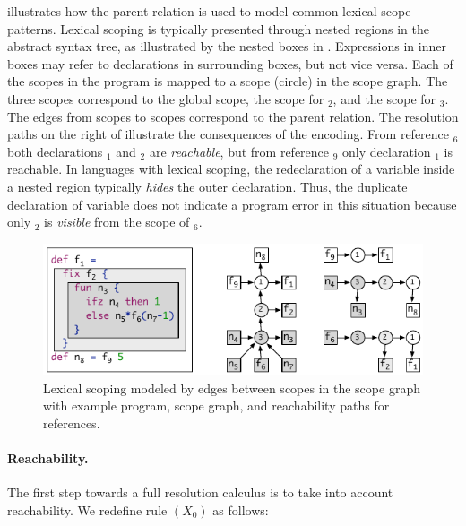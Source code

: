  illustrates how the parent relation is used to model common
lexical scope patterns.
Lexical scoping is typically presented through nested regions in the abstract
syntax tree, as illustrated by the nested boxes in .
Expressions in inner boxes may refer to declarations in surrounding boxes, but
not vice versa.
Each of the scopes in the program is mapped to a scope (circle) in the scope
graph.
The three scopes correspond to the global scope, the scope for $_2$, and the scope for $_3$.
The edges from scopes to scopes correspond to the parent relation.
The resolution paths on the right of  illustrate the consequences
of the encoding.
From reference $_6$ both declarations $_1$ and
$_2$ are \emph{reachable}, but from reference $_9$ only
declaration $_1$ is reachable.
In languages with lexical scoping, the redeclaration of
a variable inside a nested region typically \emph{hides} the outer
declaration.
Thus, the duplicate declaration of variable  does not indicate
a program error in this situation
because only $_2$ is \emph{visible} from the scope of
$_6$.


\begin{figure}[t]
\begin{boxedminipage}{\hsize}
\centering\includegraphics{figures/scope-graphs/lexical/example.pdf}
\end{boxedminipage}
\vspace*{-\baselineskip}
\caption{Lexical scoping modeled by edges between scopes in the scope
graph with example program, scope graph, and reachability paths for
references.}
\end{figure}


\paragraph{Reachability.}

The first step towards a full resolution calculus is to take into account
reachability. We redefine rule $(X_0)$ as follows: 

